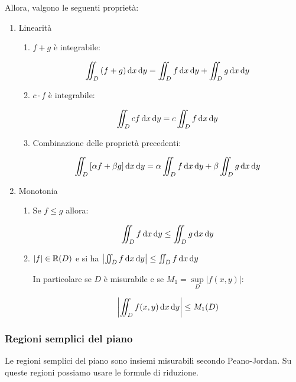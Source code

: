 Allora, valgono le seguenti proprietà:
\begin{enumerate}
    \item Linearità
          \begin{enumerate}
              \item \(f+g\) è integrabile:

                    \[
                        \iint_D {(f+g)} \mathop{}\!\mathrm{d}{x}\mathop{}\!\mathrm{d}{y}  = \iint_D f \mathop{}\!\mathrm{d}{x}\mathop{}\!\mathrm{d}{y} + \iint_D g \mathop{}\!\mathrm{d}{x}\mathop{}\!\mathrm{d}{y}
                    \]
              \item \(c\cdot f\) è integrabile:

                    \[
                        \iint_D {c f} \mathop{}\!\mathrm{d}{x}\mathop{}\!\mathrm{d}{y} = c \iint_D f \mathop{}\!\mathrm{d}{x}\mathop{}\!\mathrm{d}{y}
                    \]

              \item Combinazione delle proprietà precedenti:

                    \[
                        \iint_D {[\alpha f + \beta g ]} \mathop{}\!\mathrm{d}{x}\mathop{}\!\mathrm{d}{y} = \alpha \iint_D f \mathop{}\!\mathrm{d}{x}\mathop{}\!\mathrm{d}{y} + \beta \iint_D g \mathop{}\!\mathrm{d}{x}\mathop{}\!\mathrm{d}{y}
                    \]
          \end{enumerate}

    \item Monotonia
          \begin{enumerate}
              \item Se \(f \le g\) allora:

                    \[
                        \iint_D f \mathop{}\!\mathrm{d}{x}\mathop{}\!\mathrm{d}{y} \le  \iint_D g \mathop{}\!\mathrm{d}{x}\mathop{}\!\mathrm{d}{y}
                    \]
              \item \(|f| \in \mathbb{R}(D)\) e si ha \(\left|\iint_D f \mathop{}\!\mathrm{d}{x}\mathop{}\!\mathrm{d}{y} \right| \le \iint_D f \mathop{}\!\mathrm{d}{x}\mathop{}\!\mathrm{d}{y}  \)

                    In particolare se \(D\) è misurabile e se \(M_1= \underset{D}{\sup} | f(x,y)|\):

                    \[
                        \left|\iint_D f(x,y) \mathop{}\!\mathrm{d}{x}\mathop{}\!\mathrm{d}{y}\right| \le M_1(D)
                    \]
          \end{enumerate}
\end{enumerate}

\pagebreak
\subsubsection{Regioni semplici del piano}

Le regioni semplici del piano sono insiemi misurabili secondo Peano-Jordan. Su queste regioni possiamo usare le formule di riduzione.

